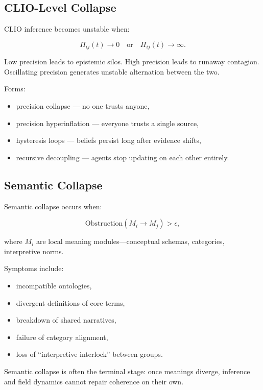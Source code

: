 \documentclass[12pt,oneside]{book}
\theoremstyle{plain}
\theoremstyle{definition}
\begin{document}
\subsection{CLIO-Level Collapse}

CLIO inference becomes unstable when:

\[
\Pi_{ij}(t) \to 0
\quad\text{or}\quad
\Pi_{ij}(t) \to \infty.
\]

Low precision leads to epistemic silos.  
High precision leads to runaway contagion.  
Oscillating precision generates unstable alternation between the two.

Forms:

\begin{itemize}
    \item precision collapse — no one trusts anyone,
    \item precision hyperinflation — everyone trusts a single source,
    \item hysteresis loops — beliefs persist long after evidence shifts,
    \item recursive decoupling — agents stop updating on each other entirely.
\end{itemize}

\subsection{Semantic Collapse}

Semantic collapse occurs when:

\[
\mathrm{Obstruction}(M_i \rightarrow M_j) > \epsilon,
\]

where $M_i$ are local meaning modules—conceptual schemas, categories, 
interpretive norms.

Symptoms include:

\begin{itemize}
    \item incompatible ontologies,
    \item divergent definitions of core terms,
    \item breakdown of shared narratives,
    \item failure of category alignment,
    \item loss of “interpretive interlock” between groups.
\end{itemize}

Semantic collapse is often the terminal stage:  
once meanings diverge, inference and field dynamics cannot repair coherence 
on their own.
\end{document}
